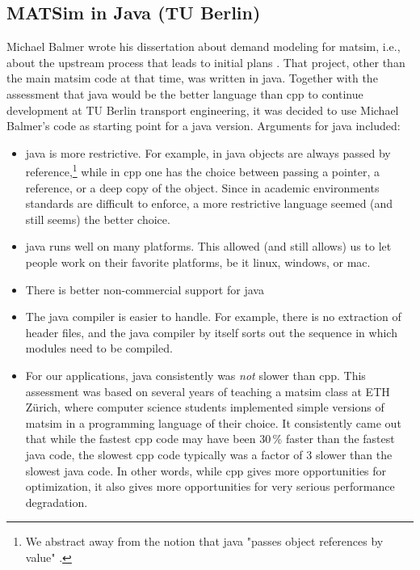 \subsection{MATSim in Java (TU Berlin)}
\label{sec:matsim-in-java}

Michael Balmer wrote his dissertation about demand modeling for \gls{matsim}, i.e.,\,about the upstream process that leads to initial plans
\citep{Balmer2007phd}.  That project, other than the main \gls{matsim} code at that time, was written in \gls{java}.  Together with the assessment that \gls{java} would be the better language than \gls{cpp} to continue development at TU Berlin transport engineering, it was decided to use Michael Balmer's code as starting point for a \gls{java} version.  Arguments for \gls{java} included:
\begin{itemize}

\item  \gls{java} is more restrictive.  For example, in \gls{java} objects are always passed by reference,\footnote{%
%
We abstract away from the notion that \gls{java} "passes object references by value" \citep{...}.
%
} while in \gls{cpp} one has the choice between passing a pointer, a reference, or a deep copy of the object.  Since in academic environments standards are difficult to enforce, a more restrictive language seemed (and still seems) the better choice.

\item \gls{java} runs well on many platforms.  This allowed (and still allows) us to let people work on their favorite platforms, be it linux, \gls{windows}, or \gls{mac}.

\item There is better non-commercial support for \gls{java} 

\item The \gls{java} compiler is easier to handle.  For example, there is no extraction of header files, and the \gls{java} compiler by itself sorts out the sequence in which modules need to be compiled.

\item For our applications, \gls{java} consistently was \emph{not} slower than \gls{cpp}.  This assessment was based on several years of teaching a \gls{matsim} class at ETH Zürich, where computer science students implemented simple versions of \gls{matsim} in a programming language of their choice.  It consistently came out that while the fastest \gls{cpp} code may have been 30\,\% faster than the fastest \gls{java} code, the slowest \gls{cpp} code typically was a factor of 3 slower than the slowest \gls{java} code.  In other words, while \gls{cpp} gives more opportunities for optimization, it also gives more opportunities for very serious performance degradation.


\end{itemize}
